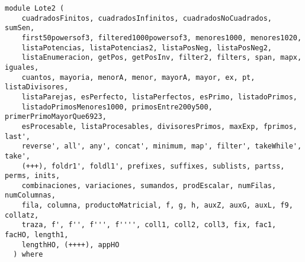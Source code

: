 \label{module:Lote2}
\haddockbeginheader
{\haddockverb\begin{verbatim}
module Lote2 (
    cuadradosFinitos, cuadradosInfinitos, cuadradosNoCuadrados, sumSen,
    first50powersof3, filtered1000powersof3, menores1000, menores1020,
    listaPotencias, listaPotencias2, listaPosNeg, listaPosNeg2,
    listaEnumeracion, getPos, getPosInv, filter2, filters, span, mapx, iguales,
    cuantos, mayoria, menorA, menor, mayorA, mayor, ex, pt, listaDivisores,
    listaParejas, esPerfecto, listaPerfectos, esPrimo, listadoPrimos,
    listadoPrimosMenores1000, primosEntre200y500, primerPrimoMayorQue6923,
    esProcesable, listaProcesables, divisoresPrimos, maxExp, fprimos, last',
    reverse', all', any', concat', minimum, map', filter', takeWhile', take',
    (+++), foldr1', foldl1', prefixes, suffixes, sublists, partss, perms, inits,
    combinaciones, variaciones, sumandos, prodEscalar, numFilas, numColumnas,
    fila, columna, productoMatricial, f, g, h, auxZ, auxG, auxL, f9, collatz,
    traza, f', f'', f''', f'''', coll1, coll2, coll3, fix, fac1, facHO, length1,
    lengthHO, (++++), appHO
  ) where\end{verbatim}}
\haddockendheader

